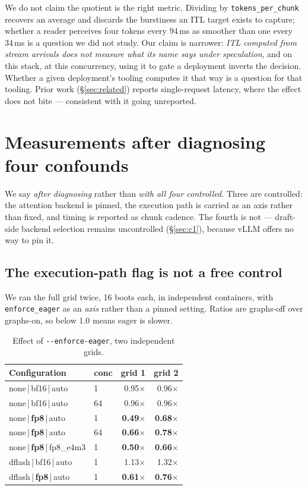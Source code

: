 \documentclass[11pt]{article}
\newcommand{\tw}[1]{\texttt{\small #1}}
\begin{document}
We do not claim the quotient is the right metric. Dividing by
\tw{tokens\_per\_chunk} recovers an average and discards the burstiness an
ITL target exists to capture; whether a reader perceives four tokens every
94\,ms as smoother than one every 34\,ms is a question we did not study. Our
claim is narrower: \emph{ITL computed from stream arrivals does not measure
what its name says under speculation}, and on this stack, at this
concurrency, using it to gate a deployment inverts the decision. Whether a
given deployment's tooling computes it that way is a question for that
tooling. Prior work
(\S\ref{sec:related}) reports single-request latency, where the effect does
not bite --- consistent with it going unreported.

\section{Measurements after diagnosing four confounds}\label{sec:results}

\noindent
We say \emph{after diagnosing} rather than \emph{with all four controlled}.
Three are controlled: the attention backend is pinned, the execution path is
carried as an axis rather than fixed, and timing is reported as chunk
cadence. The fourth is not --- draft-side backend selection remains
uncontrolled (\S\ref{sec:c1}), because vLLM offers no way to pin it.

\subsection{The execution-path flag is not a free control}

We ran the full grid twice, 16 boots each, in independent containers, with
\tw{enforce\_eager} as an \emph{axis} rather than a pinned setting. Ratios
are graphs-off over graphs-on, so below 1.0 means eager is slower.

\begin{table}[h]\centering\small
\caption{Effect of \tw{-{}-enforce-eager}, two independent grids.}
\begin{tabular}{llrr}
\toprule
Configuration & conc & grid 1 & grid 2\\
\midrule
none\,|\,bf16\,|\,auto & 1 & 0.95$\times$ & 0.96$\times$\\
none\,|\,bf16\,|\,auto & 64 & 0.96$\times$ & 0.96$\times$\\
none\,|\,\textbf{fp8}\,|\,auto & 1 & \textbf{0.49$\times$} & \textbf{0.68$\times$}\\
none\,|\,\textbf{fp8}\,|\,auto & 64 & \textbf{0.66$\times$} & \textbf{0.78$\times$}\\
none\,|\,\textbf{fp8}\,|\,fp8\_e4m3 & 1 & \textbf{0.50$\times$} & \textbf{0.66$\times$}\\
dflash\,|\,bf16\,|\,auto & 1 & 1.13$\times$ & 1.32$\times$\\
dflash\,|\,\textbf{fp8}\,|\,auto & 1 & \textbf{0.61$\times$} & \textbf{0.76$\times$}\\
\bottomrule
\end{tabular}
\end{table}
\end{document}
